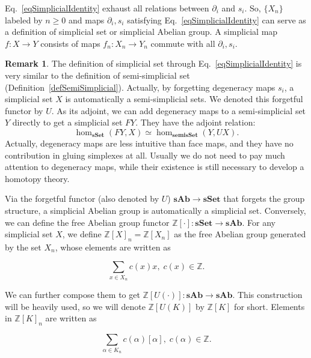 \documentclass[reprint, amsmath, amssymb, showpacs, floatfix, longbibliography, aps, twocolumn, superscriptaddress, nofootinbib]{revtex4-2}
\newcommand{\ZZ}{{\mathbb Z}}
\theoremstyle{definition}
\newtheorem{remark}{Remark}[section]
\begin{document}
Eq.~\eqref{eqSimplicialIdentity} exhaust all relations between $\partial_i$ and $s_i$. So, $\{X_n\}$ labeled by $n\ge0$ and maps $\partial_i,s_i$ satisfying Eq.~\eqref{eqSimplicialIdentity} can serve as a definition of simplicial set or simplicial Abelian group. A simplicial map $f:X\rightarrow Y$ consists of maps $f_n:X_n\rightarrow Y_n$ commute with all $\partial_i,s_i$.

\begin{remark}\label{remarkSemeSimplicial}
	The definition of simplicial set through Eq.~\eqref{eqSimplicialIdentity} is very similar to the definition of semi-simplicial set (Definition~\ref{defSemiSimplicial}). Actually, by forgetting degeneracy maps $s_i$, a simplicial set $X$ is automatically a semi-simplicial sets. We denoted this forgetful functor by $U$. As its adjoint, we can add degeneracy maps to a semi-simplicial set $Y$ directly to get a simplicial set $FY$. They have the adjoint relation:
	\begin{equation}
		\hom_{\mathbf{sSet}}(FY,X)\simeq \hom_{\mathbf{semisSet}}(Y,UX).
	\end{equation}
	 Actually, degeneracy maps are less intuitive than face maps, and they have no contribution in gluing simplexes at all. Usually we do not need to pay much attention to degeneracy maps, while their existence is still necessary to develop a homotopy theory. 
\end{remark}

Via the forgetful functor (also denoted by $U$) $\mathbf{sAb}\rightarrow\mathbf{sSet}$ that forgets the group structure, a simplicial Abelian group is automatically a simplicial set. Conversely, we can define the free Abelian group functor $\ZZ[\cdot]:\mathbf{sSet}\rightarrow\mathbf{sAb}$. For any simplicial set $X$, we define $\ZZ[X]_n=\ZZ[X_n]$ as the free Abelian group generated by the set $X_n$, whose elements are written as

\begin{equation}
	\sum_{x\in X_n}c(x)x,\;c(x)\in\ZZ.
\end{equation}

We can further compose them to get $\ZZ[U(\cdot)]:\mathbf{sAb}\rightarrow \mathbf{sAb}$. This construction will be heavily used, so we will denote $\ZZ[U(K)]$ by $\ZZ[K]$ for short. Elements in $\ZZ[K]_n$ are written as

\begin{equation}
	\sum_{\alpha\in K_n}c(\alpha)[\alpha],\;c(\alpha)\in \ZZ.
\end{equation}
\end{document}
